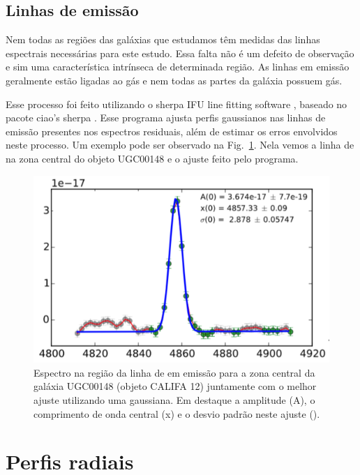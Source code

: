\subsection{Linhas de emissão}
\label{sec:intro:UFSCeIAA:EmLines}

Nem todas as regiões das galáxias que estudamos têm medidas das linhas espectrais necessárias para este estudo. Essa falta não é um defeito de observação e sim uma característica intrínseca de determinada região. As linhas em emissão geralmente estão ligadas ao gás e nem todas as partes da galáxia possuem gás.

Esse processo foi feito utilizando o {\sc sherpa} IFU line fitting software \citep[SHIFU;][]{RGB.etal.2017}, baseado no pacote {\sc ciao's sherpa} \citep{Freeman.etal.2001, Doe.etal.2007}. Esse programa ajusta perfis gaussianos nas linhas de emissão presentes nos espectros residuais, além de estimar os erros envolvidos neste processo. Um exemplo pode ser observado na Fig.\ \ref{fig:rgbline}. Nela vemos a linha de \Hb na zona central do objeto UGC00148 e o ajuste feito pelo programa.

\begin{figure}
	\centering
	\includegraphics[scale=0.4]{figuras/K0012-zone0-Hb.pdf}
	\caption[Exemplo de ajuste de linha de emissão]
	{Espectro na região da linha de \Hbeta em emissão para a zona central da galáxia UGC00148 (objeto
CALIFA 12) juntamente com o melhor ajuste utilizando uma gaussiana. Em destaque a amplitude (A), o
comprimento de onda central (x) e o desvio padrão neste ajuste (\sigma).}
	\label{fig:rgbline}
\end{figure}




\section{Perfis radiais}
\label{sec:amostra:rad}

